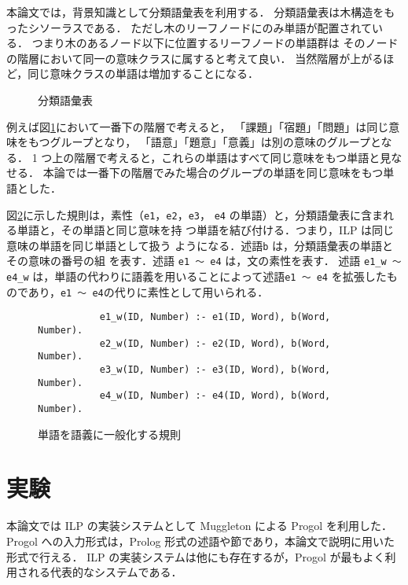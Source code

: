 本論文では，背景知識として分類語彙表\cite{bunrui-tab}を利用する．
分類語彙表は木構造をもったシソーラスである．
ただし木のリーフノードにのみ単語が配置されている．
つまり木のあるノード以下に位置するリーフノードの単語群は
そのノードの階層において同一の意味クラスに属すると考えて良い．
当然階層が上がるほど，同じ意味クラスの単語は増加することになる．

\begin{figure}[htbp]
\begin{center}
\epsfxsize=95.67mm
\end{center}
\caption{分類語彙表}\label{fig::bunrui}
\end{figure}

例えば\mbox{図\ref{fig::bunrui}}において一番下の階層で考えると，
「課題」「宿題」「問題」は同じ意味をもつグループとなり，
「語意」「題意」「意義」は別の意味のグループとなる．
1 つ上の階層で考えると，これらの単語はすべて同じ意味をもつ単語と見なせる．
本論では一番下の階層でみた場合のグループの単語を同じ意味をもつ単語とした．

図\ref{fig::ex_rule}に示した規則は，素性（\verb|e1|，\verb|e2|，\verb|e3|，
\verb|e4| の単語）と，分類語彙表に含まれる単語と，その単語と同じ意味を持
つ単語を結び付ける．つまり，ILP は同じ意味の単語を同じ単語として扱う
ようになる．述語\verb|b| は，分類語彙表の単語とその意味の番号の組
を表す．述語 \verb|e1 〜 e4| は，文の素性を表す．
述語 \verb|e1_w 〜 e4_w| は，単語の代わりに語義を用いることによって述語\verb|e1 〜 e4|
を拡張したものであり，\verb|e1 〜 e4|の代りに素性として用いられる．

\begin{figure}[htbp]
\begin{verbatim}
           e1_w(ID, Number) :- e1(ID, Word), b(Word, Number).
           e2_w(ID, Number) :- e2(ID, Word), b(Word, Number).
           e3_w(ID, Number) :- e3(ID, Word), b(Word, Number).
           e4_w(ID, Number) :- e4(ID, Word), b(Word, Number).
\end{verbatim}
\caption{単語を語義に一般化する規則}
\label{fig::ex_rule}
\end{figure}



\section{実験}


本論文では ILP の実装システムとして Muggleton による  Progol\cite{muggen2} を利用した．
Progol への入力形式は，Prolog 形式の述語や節であり，本論文で説明に用いた形式で行える．
ILP の実装システムは他にも存在するが，Progol が最もよく利用される代表的なシステムである．

